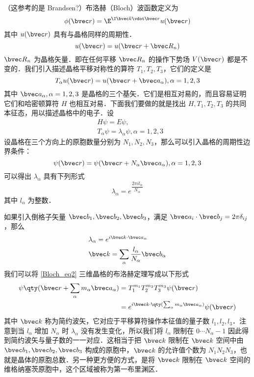 （这参考的是 Brandsen?）布洛赫（Bloch）波函数定义为
\begin{equation}\label{Bloch_eq2}
\phi(\bvec r) = \E^{\I \bvec k \vdot \bvec r} u(\bvec r)
\end{equation}
其中 $u(\bvec r)$ 具有与晶格同样的周期性．
\begin{equation}
u(\bvec r)=u(\bvec r+\bvec R_n)
\end{equation}
$\bvec R_n$ 为晶格矢量．即在任何平移 $\bvec R_n$ 的操作下势场 $V(\bvec r)$ 都是不变的．我们引入描述晶格平移对称性的算符 $T_1,T_2,T_3$，它们的定义是
\begin{equation}
T_\alpha u(\bvec r)= u(\bvec r+\bvec a_\alpha),\alpha=1,2,3
\end{equation}
其中 $\bvec a_\alpha,\alpha=1,2,3$ 是晶格的三个基矢．它们是相互对易的，而且容易证明它们和哈密顿算符 $H$ 也相互对易．下面我们要做的就是找出 $H,T_1,T_2,T_3$ 的共同本征态，用以描述晶格中的电子．设
\begin{equation}
\begin{aligned}
&H\psi=E\psi,\\
&T_\alpha \psi = \lambda_\alpha \psi, \alpha=1,2,3
\end{aligned}
\end{equation}
设晶格在三个方向上的原胞数量分别为 $N_1,N_2,N_3$，那么可以引入晶格的周期性边界条件：
\begin{equation}
\psi(\bvec r)=\psi(\bvec r+N_\alpha \bvec a_\alpha),\alpha=1,2,3
\end{equation}
可以得出 $\lambda_\alpha$ 具有下列形式
\begin{equation}
\lambda_\alpha=e^{ \dfrac{2\pi i l_\alpha}{N_\alpha}}
\end{equation}
其中 $l_\alpha$ 为整数．

如果引入倒格子矢量 $\bvec b_1,\bvec b_2,\bvec b_3$，满足 $\bvec a_i \cdot \bvec b_j = 2\pi \delta_{ij}$，那么
\begin{equation}
\begin{aligned}
&\lambda_\alpha = e^{i \bvec k \cdot \bvec a_\alpha}\\
&\bvec k=\sum_\alpha\frac{l_\alpha}{N_\alpha} \bvec b_\alpha
\end{aligned}
\end{equation}
我们可以将 \autoref{Bloch_eq2} 三维晶格的布洛赫定理写成以下形式
\begin{equation}
\begin{aligned}
\psi\qty(\bvec r+\sum_\alpha m_\alpha\bvec a_\alpha) &= T_1^{m_1} T_2^{m_2} T_3^{m_3} \psi(\bvec r)\\
&=e^{i\bvec k\cdot \qty(\sum_\alpha m_\alpha\bvec a_\alpha)}\psi(\bvec r)
\end{aligned}
\end{equation}
其中 $\bvec k$ 称为简约波矢，它对应于平移算符操作本征值的量子数 $l_1,l_2,l_3$．注意到当 $l_\alpha$ 增加 $N_\alpha$ 时 $\lambda_\alpha$ 没有发生变化，所以我们将 $l_\alpha$ 限制在 $0\cdots N_\alpha-1$ 因此得到简约波矢与量子数的一一对应．这相当于把 $\bvec k$ 限制在 $\bvec k$ 空间中由 $\bvec b_1,\bvec b_2,\bvec b_3$ 构成的原胞中，$\bvec k$ 的允许值个数为 $N_1N_2N_3$，也就是晶体的原胞总数．另一种更方便的方式，是将 $\bvec k$ 限制在 $\bvec k$ 空间的维格纳塞茨原胞中，这个区域被称为第一布里渊区．